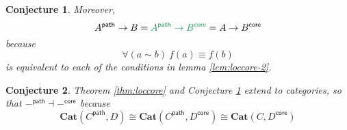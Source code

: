 \documentclass{article}
\newtheorem{conjecture}{Conjecture}
\newcommand{\ms}[1]{\ensuremath{\mathsf{#1}}}
\newcommand{\mb}[1]{\ensuremath{\mathbf{#1}}}
\newcommand{\iso}{\ms{core}}
\renewcommand{\path}{\ms{path}}
\newcommand{\pathto}{\sim}
\begin{document}
\begin{conjecture} \label{cnj:loccore} Moreover,
  \[ A^\path \to B = {\color{ForestGreen} A^\path \to B^\iso} = A \to B^\iso \]
  because
  \[ \forall(a \pathto b)\ f(a) \equiv f(b) \]
  is equivalent to each of the conditions in lemma \ref{lem:loccore-2}.
\end{conjecture}


\begin{conjecture}
  Theorem \ref{thm:loccore} and Conjecture \ref{cnj:loccore} extend to
  categories, so that $-^\path \dashv -^\iso$ because
  \begin{equation}
    \mb{Cat}(C^\path, D) \cong \mb{Cat}(C^\path, D^\iso) \cong \mb{Cat}(C, D^\iso)
  \end{equation}
\end{conjecture}
\end{document}
